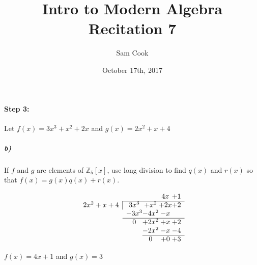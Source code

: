 \documentclass[a4paper,11pt]{article}
\author{Sam Cook}
\title{Intro to Modern Algebra \\Recitation 7}
\date{October 17th, 2017}
\begin{document}
\maketitle

\paragraph{Step 3:\\}
Let $f(x) = 3x^3 + x^2 + 2x$ and $g(x) = 2x^2+x+4$
\subparagraph{b)}
If $f$ and $g$ are elements of $\mathbb{Z}_5[x]$, use long division to find $q(x)$ and $r(x)$ so that $f(x) = g(x)q(x) + r(x)$.



$$
\begin{array}{rc@{}c@{} c@{}c}
&&& 4x & +1\\ \cline{2-5}
\multicolumn{1}{r|}{2x^2 + x + 4} & 3x^3& +x^2&+2x& +2\\
&-3x^3&-4x^2 &-x&\\ \cline{2-5}
&0&+2x^2&+x& +2\\
&&-2x^2&-x&-4\\ \cline{3-5}
&& 0 & +0& +3\\
\end{array}
$$

$f(x) = 4x+1$ and $g(x) = 3$
\end{document}
